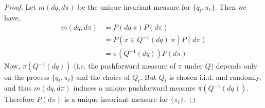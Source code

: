 \documentclass{article}
\begin{document}
\begin{proof}

    Let \(m(dq,d\pi)\) be the unique invariant measure for \(\{q_t,\pi_t\}\). Then we have,
    \begin{align*} m(dq,d\pi) & = P(dq | \pi)P(d\pi)               \\
                   & = P(x \in Q^{-1}(dq) | \pi)P(d\pi) \\
                   & = \pi(Q^{-1}(dq))P(d\pi)
    \end{align*}
    Now, \(\pi(Q^{-1}(dq))\) (i.e. the pushforward measure of \(\pi\) under \(Q\)) depends only on the process \(\{q_t,\pi_t\}\) and the choice of \(Q_t\). But \(Q_t\) is chosen i.i.d. and randomly, and thus \(m(dq,d\pi)\) induces a unique pushforward measure \(\pi(Q^{-1}(dq))\). Therefore \(P(d\pi)\) is a unique invariant measure for \(\{\pi_t\}\).




\end{proof}
\end{document}
